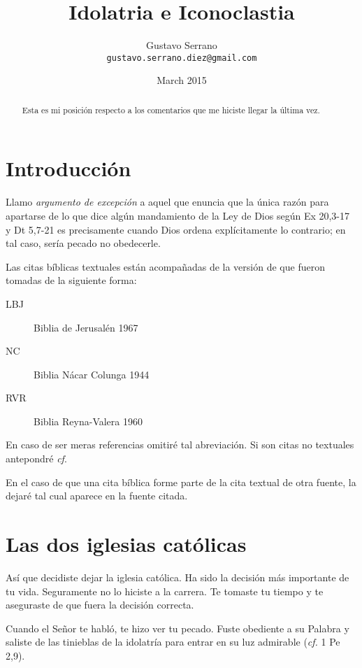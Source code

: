 \documentclass{article}
\title{Idolatria e Iconoclastia}
\author{Gustavo Serrano \\ \tt{gustavo.serrano.diez@gmail.com}}
\date{March 2015}
\begin{document}
\maketitle

\begin{abstract}
\noindent
Esta es mi posici\'on respecto a los comentarios que me hiciste llegar la \'ultima vez.
\end{abstract}

\tableofcontents

\section{Introducci\'on}

Llamo \emph{argumento de excepci\'on} a aquel que enuncia que la \'unica raz\'on para apartarse de lo que dice alg\'un mandamiento de la Ley de Dios seg\'un Ex 20,3-17 y Dt 5,7-21 es precisamente cuando Dios ordena expl\'{i}citamente lo contrario; en tal caso, ser\'{i}a pecado no obedecerle.

Las citas b\'{i}blicas textuales est\'an acompa\~nadas de la versi\'on de que fueron tomadas de la siguiente forma:

\begin{description}
\item[LBJ] Biblia de Jerusal\'en 1967
\item[NC] Biblia N\'acar Colunga 1944
\item[RVR] Biblia Reyna-Valera 1960
\end{description}

\noindent
En caso de ser meras referencias omitir\'e tal abreviaci\'on. Si son citas no textuales antepondr\'e \emph{cf}.

En el caso de que una cita b\'{i}blica forme parte de la cita textual de otra fuente, la dejar\'e tal cual aparece en la fuente citada.

\section{Las dos iglesias cat\'olicas}

As\'{i} que decidiste dejar la iglesia cat\'olica. Ha sido la decisi\'on m\'as importante de tu vida. Seguramente no lo hiciste a la carrera. Te tomaste tu tiempo y te aseguraste de que fuera la decisi\'on correcta. 

Cuando el Se\~nor te habl\'o, te hizo ver tu pecado. Fuste obediente a su Palabra y saliste de las tinieblas de la idolatr\'{i}a para entrar en su luz admirable (\emph{cf.} 1 Pe 2,9).
\end{document}
